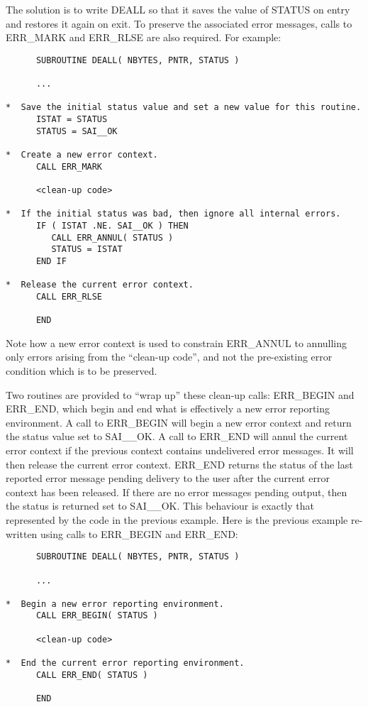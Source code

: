 The solution is to write DEALL so that it saves the value of STATUS on entry
and restores it again on exit. 
To preserve the associated error messages, calls to ERR\_MARK and ERR\_RLSE
are also required. 
For example:


\begin {small}
\begin{verbatim}
      SUBROUTINE DEALL( NBYTES, PNTR, STATUS )

      ...

*  Save the initial status value and set a new value for this routine.
      ISTAT = STATUS
      STATUS = SAI__OK

*  Create a new error context.
      CALL ERR_MARK

      <clean-up code>

*  If the initial status was bad, then ignore all internal errors.
      IF ( ISTAT .NE. SAI__OK ) THEN
         CALL ERR_ANNUL( STATUS )
         STATUS = ISTAT
      END IF

*  Release the current error context.
      CALL ERR_RLSE

      END
\end{verbatim}
\end {small}

Note how a new error context is used to constrain ERR\_ANNUL to annulling
only errors arising from the ``clean-up code'', and not the pre-existing
error condition which is to be preserved. 

Two routines are provided to ``wrap up'' these clean-up calls: ERR\_BEGIN and
ERR\_END, which begin and end what is effectively a new error reporting
environment.
A call to ERR\_BEGIN will begin a new error context and return the 
status value set to SAI\_\_OK. 
A call to ERR\_END will annul the current error context if the previous
context contains undelivered error messages.
It will then release the current error context.
ERR\_END returns the status of the last reported error message pending
delivery to the user after the current error context has been released.
If there are no error messages pending output, then the status is
returned set to SAI\_\_OK.
This behaviour is exactly that represented by the code in the previous example.
Here is the previous example re-written using calls to ERR\_BEGIN and
ERR\_END:

\begin {small}
\begin{verbatim}
      SUBROUTINE DEALL( NBYTES, PNTR, STATUS )

      ...

*  Begin a new error reporting environment.
      CALL ERR_BEGIN( STATUS )

      <clean-up code>

*  End the current error reporting environment.
      CALL ERR_END( STATUS )

      END
\end{verbatim}
\end {small}

